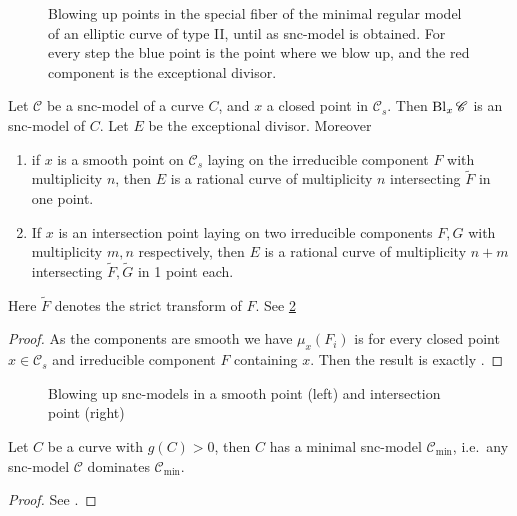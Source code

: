 \begin{figure}[ht]
    \centering
    \caption{Blowing up points in the special fiber of the minimal regular model of an elliptic curve of type II, until as snc-model is obtained. 
    For every step the blue point is the point where we blow up, and the red component is the exceptional divisor. }
    \label{fig:snc_model_curve_type_ii}
\end{figure}


\begin{lemma}\label{lem:blowup_snc}
	Let $\mathscr C$ be a snc-model of a curve $C$, and $x$ a closed point in $\mathscr C_s$. 
	Then $\operatorname{Bl}_x\mathscr C$ is an snc-model of $C$. Let $E$ be the exceptional divisor. 
	Moreover 
	\begin{enumerate}
		\item if $x$ is a smooth point on $\mathscr C_s$ laying on the irreducible component $F$ with multiplicity $n$, then $E$ is a rational curve of multiplicity $n$ intersecting $\tilde F$ in one point. 
		\item If $x$ is an intersection point laying on two irreducible components $F, G$ with multiplicity  $m, n$ respectively, then $E$ is a rational curve of multiplicity $n + m$ intersecting $\tilde F, \tilde G$ in 1 point each. 
	\end{enumerate}
	Here $\tilde F$ denotes the strict transform of $F$. 
	See \cref{fig:blowup-snc}
\end{lemma}
\begin{proof}
	As the components are smooth we have $\mu_x(F_i) $ is for every closed point $x \in \mathscr C_s$ and irreducible component  $F$ containing $x$. 
	Then the result is exactly \cite[exercise 9.2.9(a)]{liuAlgebraicGeometryArithmetic2002}.
\end{proof}
\begin{figure}[ht]
    \centering
    \caption{Blowing up snc-models in a smooth point (left) and intersection point (right)}
    \label{fig:blowup-snc}
\end{figure}




\begin{theorem}\label{thm:minimal_snc_model}
	Let $C$ be a curve with  $g(C) > 0$, then $C$ has a minimal snc-model $\mathscr C_\text{min} $, i.e.\ any snc-model $\mathscr C$ dominates $\mathscr C_\text{min} $. 
\end{theorem}
\begin{proof}
	See \cite[prop.\ 9.3.36]{liuAlgebraicGeometryArithmetic2002}.
\end{proof}

